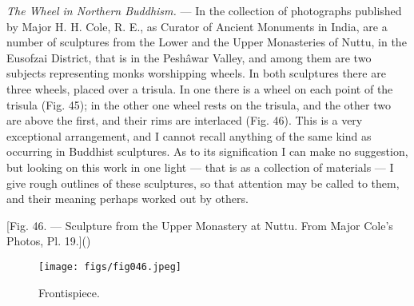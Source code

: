 \documentclass[a4paper, 11pt, oneside, polutonikogreek, english]{article}
\begin{document}
\emph{The Wheel in Northern Buddhism.} --- In the collection of photographs published by Major H. H. Cole, R. E., as Curator of Ancient Monuments in India, are a number of sculptures from the Lower and the Upper Monasteries of Nuttu, in the Eusofzai District, that is in the Peshâwar Valley, and among them are two subjects representing monks worshipping wheels. In both sculptures there are three wheels, placed over a trisula. In one there is a wheel on each point of the trisula (Fig. 45); in the other one wheel rests on the trisula, and the other two are above the first, and their rims are interlaced (Fig. 46). This is a very exceptional arrangement, and I cannot recall anything of the same kind as occurring in Buddhist sculptures. As to its signification I can make no suggestion, but looking on this work in one light --- that is as a collection of materials --- I give rough outlines of these sculptures, so that attention may be called to them, and their meaning perhaps worked out by others.

[Fig. 46. --- Sculpture from the Upper Monastery at Nuttu. From Major Cole's Photos, Pl. 19.]()
\begin{figure}[H]
\centering
\texttt{[image: figs/fig046.jpeg]}
\caption{Frontispiece.}
\end{figure}
\end{document}
